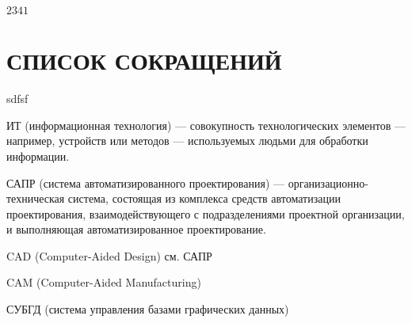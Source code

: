 $2341$

\section*{СПИСОК СОКРАЩЕНИЙ}
  sdfsf
\begin{description}
 \item{ИТ} (информационная технология) --- совокупность технологических
   элементов --- например, устройств или методов --- используемых людьми
   для обработки информации.
 \item{САПР} (система автоматизированного проектирования) ---
   организационно-техни\-ческая система, состоящая из комплекса средств
   автоматизации проектирования, взаимодействующего с подразделениями
   проектной организации, и выполняющая автоматизированное проектирование.
 \item{CAD} (Computer-Aided Design) см. САПР
 \item{CAM} (Computer-Aided Manufacturing)
 \item{СУБГД} (система управления базами графических данных)


\end{description}
